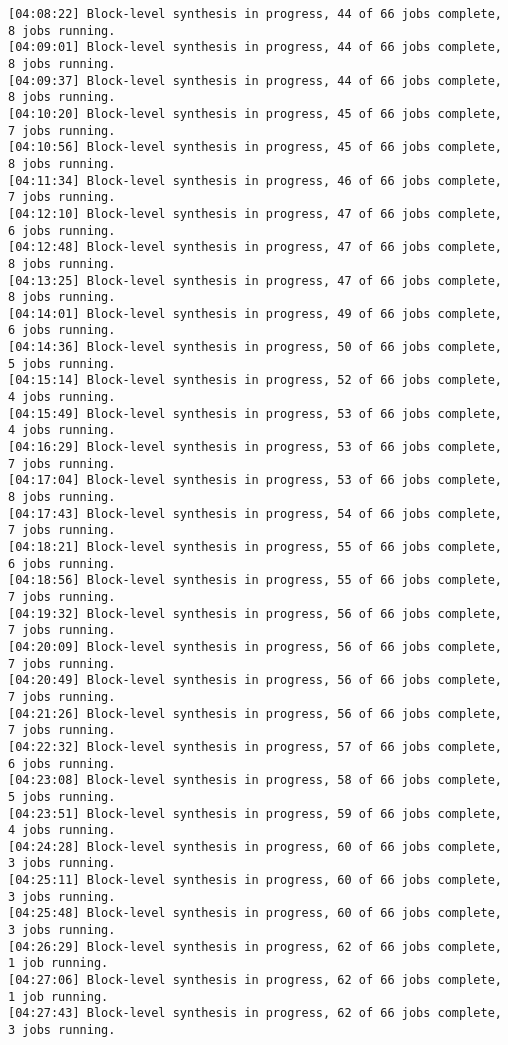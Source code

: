 \begin{center}
\begin{lstlisting}[label=lst:vlog,caption=Файл v++\_vinc.log]
[04:08:22] Block-level synthesis in progress, 44 of 66 jobs complete, 8 jobs running.
[04:09:01] Block-level synthesis in progress, 44 of 66 jobs complete, 8 jobs running.
[04:09:37] Block-level synthesis in progress, 44 of 66 jobs complete, 8 jobs running.
[04:10:20] Block-level synthesis in progress, 45 of 66 jobs complete, 7 jobs running.
[04:10:56] Block-level synthesis in progress, 45 of 66 jobs complete, 8 jobs running.
[04:11:34] Block-level synthesis in progress, 46 of 66 jobs complete, 7 jobs running.
[04:12:10] Block-level synthesis in progress, 47 of 66 jobs complete, 6 jobs running.
[04:12:48] Block-level synthesis in progress, 47 of 66 jobs complete, 8 jobs running.
[04:13:25] Block-level synthesis in progress, 47 of 66 jobs complete, 8 jobs running.
[04:14:01] Block-level synthesis in progress, 49 of 66 jobs complete, 6 jobs running.
[04:14:36] Block-level synthesis in progress, 50 of 66 jobs complete, 5 jobs running.
[04:15:14] Block-level synthesis in progress, 52 of 66 jobs complete, 4 jobs running.
[04:15:49] Block-level synthesis in progress, 53 of 66 jobs complete, 4 jobs running.
[04:16:29] Block-level synthesis in progress, 53 of 66 jobs complete, 7 jobs running.
[04:17:04] Block-level synthesis in progress, 53 of 66 jobs complete, 8 jobs running.
[04:17:43] Block-level synthesis in progress, 54 of 66 jobs complete, 7 jobs running.
[04:18:21] Block-level synthesis in progress, 55 of 66 jobs complete, 6 jobs running.
[04:18:56] Block-level synthesis in progress, 55 of 66 jobs complete, 7 jobs running.
[04:19:32] Block-level synthesis in progress, 56 of 66 jobs complete, 7 jobs running.
[04:20:09] Block-level synthesis in progress, 56 of 66 jobs complete, 7 jobs running.
[04:20:49] Block-level synthesis in progress, 56 of 66 jobs complete, 7 jobs running.
[04:21:26] Block-level synthesis in progress, 56 of 66 jobs complete, 7 jobs running.
[04:22:32] Block-level synthesis in progress, 57 of 66 jobs complete, 6 jobs running.
[04:23:08] Block-level synthesis in progress, 58 of 66 jobs complete, 5 jobs running.
[04:23:51] Block-level synthesis in progress, 59 of 66 jobs complete, 4 jobs running.
[04:24:28] Block-level synthesis in progress, 60 of 66 jobs complete, 3 jobs running.
[04:25:11] Block-level synthesis in progress, 60 of 66 jobs complete, 3 jobs running.
[04:25:48] Block-level synthesis in progress, 60 of 66 jobs complete, 3 jobs running.
[04:26:29] Block-level synthesis in progress, 62 of 66 jobs complete, 1 job running.
[04:27:06] Block-level synthesis in progress, 62 of 66 jobs complete, 1 job running.
[04:27:43] Block-level synthesis in progress, 62 of 66 jobs complete, 3 jobs running.

\end{lstlisting}
\end{center}
